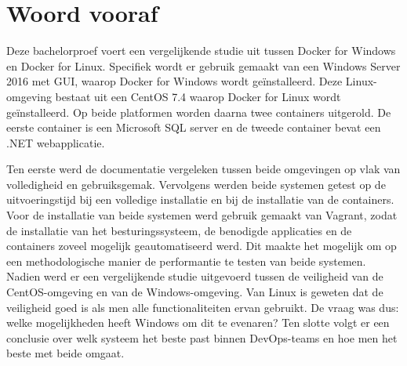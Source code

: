 
\chapter*{Woord vooraf}
\label{ch:voorwoord}



Deze bachelorproef voert een vergelijkende studie uit tussen Docker for Windows en Docker for Linux. Specifiek wordt er gebruik gemaakt van een Windows Server 2016 met GUI, waarop Docker for Windows wordt geïnstalleerd. Deze Linux-omgeving bestaat uit een CentOS 7.4 waarop Docker for Linux wordt geïnstalleerd. Op beide platformen worden daarna twee containers uitgerold. De eerste container is een Microsoft SQL server en de tweede container bevat een .NET webapplicatie.

Ten eerste werd de documentatie vergeleken tussen beide omgevingen op vlak van volledigheid en gebruiksgemak.
Vervolgens werden beide systemen getest op de uitvoeringstijd bij een volledige installatie en bij de installatie van de containers. Voor de installatie van beide systemen werd gebruik gemaakt van Vagrant, zodat de installatie van het besturingssysteem, de benodigde applicaties en de containers zoveel mogelijk geautomatiseerd werd. Dit maakte het mogelijk om op een methodologische manier de performantie te testen van beide systemen.
Nadien werd er een vergelijkende studie uitgevoerd tussen de veiligheid van de CentOS-omgeving en van de Windows-omgeving. Van Linux is geweten dat de veiligheid goed is als men alle functionaliteiten ervan gebruikt. De vraag was dus: welke mogelijkheden heeft Windows om dit te evenaren?
Ten slotte volgt er een conclusie over welk systeem het beste past binnen DevOps-teams en hoe men het beste met beide omgaat.

